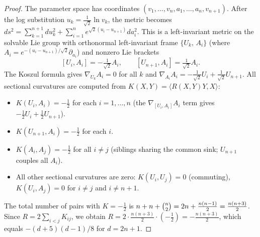 \documentclass[10pt,a4paper]{amsart}
\begin{document}
\begin{proof}
The parameter space has coordinates $(v_1,\ldots,v_n,a_1,\ldots,a_n,v_{n+1})$.  
After the log substitution $u_k = \tfrac{1}{\sqrt{2}}\ln v_k$, the metric becomes
$ds^2 = \sum_{k=1}^{n+1} du_k^2 + \sum_{i=1}^n e^{\sqrt{2}(u_i-u_{n+1})} da_i^2$.
This is a left-invariant metric on the solvable Lie group with orthonormal 
left-invariant frame $\{U_k,\, A_i\}$ (where $A_i = e^{-(u_i-u_{n+1})/\sqrt{2}}\partial_{a_i}$) 
and nonzero Lie brackets
\[
  [U_i, A_i] = -\tfrac{1}{\sqrt{2}} A_i, \qquad [U_{n+1}, A_i] = \tfrac{1}{\sqrt{2}} A_i.
\]
The Koszul formula gives $\nabla_{U_k}A_i = 0$ for all $k$ and 
$\nabla_{A_i}A_i = -\tfrac{1}{\sqrt{2}}U_i + \tfrac{1}{\sqrt{2}}U_{n+1}$.  
All sectional curvatures are computed from $K(X,Y) = \langle R(X,Y)Y, X\rangle$:
\begin{itemize}
\item $K(U_i, A_i) = -\tfrac{1}{2}$ for each $i=1,\ldots,n$ 
  (the $\nabla_{[U_i,A_i]}A_i$ term gives $-\tfrac{1}{2}U_i+\tfrac{1}{2}U_{n+1}$).
\item $K(U_{n+1}, A_i) = -\tfrac{1}{2}$ for each $i$.
\item $K(A_i, A_j) = -\tfrac{1}{2}$ for all $i \neq j$ 
  (siblings sharing the common sink; $U_{n+1}$ couples all $A_i$).
\item All other sectional curvatures are zero: 
  $K(U_i,U_j)=0$ (commuting), $K(U_i,A_j)=0$ for $i\neq j$ and $i\neq n+1$.
\end{itemize}
The total number of pairs with $K = -\tfrac{1}{2}$ is 
$n + n + \tbinom{n}{2} = 2n + \tfrac{n(n-1)}{2} = \tfrac{n(n+3)}{2}$.
Since $R = 2\sum_{i<j}K_{ij}$, we obtain $R = 2 \cdot \tfrac{n(n+3)}{2} \cdot (-\tfrac{1}{2}) = -\tfrac{n(n+3)}{2}$, 
which equals $-(d+5)(d-1)/8$ for $d=2n+1$.
\end{proof}
\end{document}
